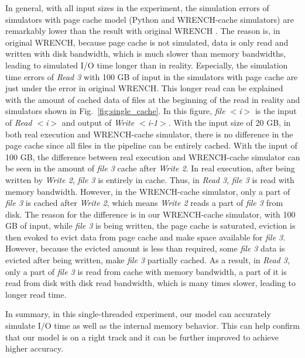 \documentclass[conference]{IEEEtran}
\begin{document}
			In general, with all input sizes in the experiment, the simulation errors
			of simulators with page cache model (Python and WRENCH-cache simulators)
			are remarkably lower than the result with original WRENCH .
			The reason is, in original WRENCH, because page cache is not simulated,
			data is only read and written with disk bandwidth, which is much slower
			than memory bandwidths, leading to simulated I/O time longer than in reality.
			Especially, the simulation time errors of \textit{Read 3} with 100 GB of input
			in the simulators with page cache are just under the error in original WRENCH.
			This longer read can be explained with the amount of cached data of files
			at the beginning of the read in reality and simulators shown in
			Fig.~\ref{fig:single_cache}.
			In this figure, \textit{file $<$i$>$} is the input of \textit{Read $<$i$>$} and
			output of \textit{Write $<$i-1$>$}.
			With the input size of 20 GB, in both real execution and WRENCH-cache
			simulator, there is no difference in the page cache since all files in the
			pipeline can be entirely cached.
			With the input of 100 GB, the difference between real execution and WRENCH-cache
			simulator can be seen in the amount of \textit{file 3} cache after \textit{Write 2}.
			In real execution, after being written by \textit{Write 2},
			\textit{file 3} is entirely in cache.
			Thus, in \textit{Read 3}, \textit{file 3} is read with memory bandwidth.
			However, in the WRENCH-cache simulator, only a part of \textit{file 3} is
			cached after \textit{Write 2}, which means \textit{Write 2} reads a part of
			\textit{file 3} from disk.
			The reason for the difference is in our WRENCH-cache simulator,
			with 100 GB of input, while \textit{file 3} is being written,
			the page cache is saturated, eviction is then evoked to evict data
			from page cache and make space available for \textit{file 3}.
			However, because the evicted amount is less than required,
			some \textit{file 3} data is evicted after being written, make \textit{file 3}
			partially cached.
			As a result, in \textit{Read 3}, only a part of \textit{file 3} is read from cache
			with memory bandwidth, a part of it is read from disk with disk read bandwidth,
			which is many times slower, leading to longer read time.

			In summary, in this single-threaded experiment, our model can accurately
			simulate I/O time as well as the internal memory behavior.
			This can help confirm that our model is on a right track and
			it can be further improved to achieve higher accuracy.
\end{document}
